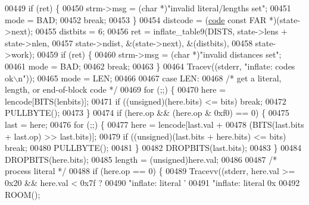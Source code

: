 \begin{DoxyCode}
{{{{{{{{00449             \textcolor{keywordflow}{if} (ret) \{
00450                 strm->msg = (\textcolor{keywordtype}{char} *)\textcolor{stringliteral}{"invalid literal/lengths set"};
00451                 mode = BAD;
00452                 \textcolor{keywordflow}{break};
00453             \}
00454             distcode = (\hyperlink{structcode}{code} \textcolor{keyword}{const} FAR *)(state->next);
00455             distbits = 6;
00456             ret = inflate\_table9(DISTS, state->lens + state->nlen,
00457                             state->ndist, &(state->next), &(distbits),
00458                             state->work);
00459             \textcolor{keywordflow}{if} (ret) \{
00460                 strm->msg = (\textcolor{keywordtype}{char} *)\textcolor{stringliteral}{"invalid distances set"};
00461                 mode = BAD;
00462                 \textcolor{keywordflow}{break};
00463             \}
00464             Tracev((stderr, \textcolor{stringliteral}{"inflate:       codes ok\(\backslash\)n"}));
00465             mode = LEN;
00466 
00467         \textcolor{keywordflow}{case} LEN:
00468             \textcolor{comment}{/* get a literal, length, or end-of-block code */}
00469             \textcolor{keywordflow}{for} (;;) \{
00470                 here = lencode[BITS(lenbits)];
00471                 \textcolor{keywordflow}{if} ((\textcolor{keywordtype}{unsigned})(here.bits) <= bits) \textcolor{keywordflow}{break};
00472                 PULLBYTE();
00473             \}
00474             \textcolor{keywordflow}{if} (here.op && (here.op & 0xf0) == 0) \{
00475                 last = here;
00476                 \textcolor{keywordflow}{for} (;;) \{
00477                     here = lencode[last.val +
00478                             (BITS(last.bits + last.op) >> last.bits)];
00479                     \textcolor{keywordflow}{if} ((\textcolor{keywordtype}{unsigned})(last.bits + here.bits) <= bits) \textcolor{keywordflow}{break};
00480                     PULLBYTE();
00481                 \}
00482                 DROPBITS(last.bits);
00483             \}
00484             DROPBITS(here.bits);
00485             length = (unsigned)here.val;
00486 
00487             \textcolor{comment}{/* process literal */}
00488             if (here.op == 0) \{
00489                 Tracevv((stderr, here.val >= 0x20 && here.val < 0x7f ?
00490                         \textcolor{stringliteral}{"inflate:         literal '%
00491                         \textcolor{stringliteral}{"inflate:         literal 0x%
00492                 ROOM();
}}}}}}}}}}
\end{DoxyCode}
